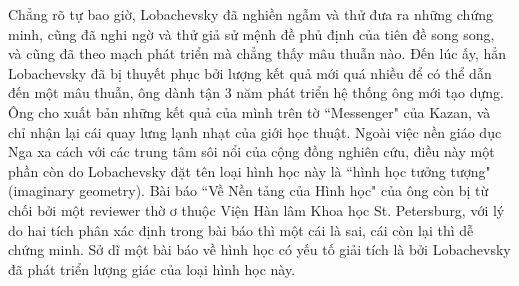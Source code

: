 \begin{multicols}{2}
	\vskip 0.01cm
	Chẳng rõ tự bao giờ, Lobachevsky đã nghiền ngẫm và thử đưa ra những chứng minh, cũng đã nghi ngờ và thử giả sử mệnh đề phủ định của tiên đề song song, và cũng đã theo mạch phát triển mà chẳng thấy mâu thuẫn nào. Đến lúc ấy, hẳn Lobachevsky đã bị thuyết phục bởi lượng kết quả mới quá nhiều để có thể dẫn đến một mâu thuẫn, ông dành tận $3$ năm phát triển hệ thống ông mới tạo dựng. Ông cho xuất bản những kết quả của mình trên tờ ``Messenger" của Kazan, và chỉ nhận lại cái quay lưng lạnh nhạt của giới học thuật. Ngoài việc nền giáo dục Nga xa cách với các trung tâm sôi nổi của cộng đồng nghiên cứu, điều này một phần còn do Lobachevsky đặt tên loại hình học này là ``hình học tưởng tượng" (imaginary geometry). Bài báo ``Về Nền tảng của Hình học" của ông còn bị từ chối bởi một reviewer thờ ơ thuộc Viện Hàn lâm Khoa học St. Petersburg, với lý do hai tích phân xác định trong bài báo thì một cái là sai, cái còn lại thì dễ chứng minh. Sở dĩ một bài báo về hình học có yếu tố giải tích là bởi Lobachevsky đã phát triển lượng giác của loại hình học này.
	\end{multicols}
